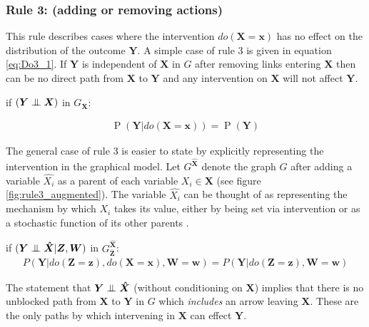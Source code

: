 \documentclass[11pt,a4paper,oneside]{book}
\newcommand{\eqn}[1]{\begin{align}#1\end{align}}
\renewcommand{\P}[1]{\operatorname{P}\left(#1\right)}
\theoremstyle{plain}
\theoremstyle{definition}
\newcommand{\ci}{\mathrel{\perp\mspace{-10mu}\perp}}
\begin{document}
\subsubsection{Rule 3: (adding or removing actions)}
This rule describes cases where the intervention $do(\boldsymbol{X}=\boldsymbol{x})$ has no effect on the distribution of the outcome $\boldsymbol{Y}$. A simple case of rule 3 is given in equation \ref{eq:Do3_1}. If $\boldsymbol{Y}$ is independent of $\boldsymbol{{X}}$ in $G$ after removing links entering $\boldsymbol{X}$ then can be no direct path from $\boldsymbol{X}$ to $\boldsymbol{Y}$ and any intervention on $\boldsymbol{X}$ will not affect $\boldsymbol{Y}$.

if $(\boldsymbol{Y} \ci \boldsymbol{{X}})$ in $G_{\boldsymbol{\overline{X}}}$:

\eqn{
\label{eq:Do3_1}
\P{\boldsymbol{Y}|do(\boldsymbol{X}=\boldsymbol{x})} = \P{\boldsymbol{Y}}
}

The general case of rule 3 is easier to state by explicitly representing the intervention in the graphical model. Let $G^{\boldsymbol{\hat{X}}}$ denote the graph $G$ after adding a variable $\hat{X_i}$ as a parent of each variable $X_i \in \boldsymbol{X}$ (see figure \ref{fig:rule3_augmented}). The variable $\hat{X_i}$ can be thought of as representing the mechanism by which $X_i$ takes its value, either by being set via intervention or as a stochastic function of its other parents \citep{Koller2009}.


if $(\boldsymbol{Y} \ci \boldsymbol{\hat{X}} |\boldsymbol{Z},\boldsymbol{W})$ in $G^{\boldsymbol{\hat{X}}}_{\boldsymbol{\overline{Z}}}$:
\eqn{
\label{eq:Do3}
P(\boldsymbol{Y}|do(\boldsymbol{Z}=\boldsymbol{z}),do(\boldsymbol{X}=\boldsymbol{x}),\boldsymbol{W}=\boldsymbol{w}) = P(\boldsymbol{Y}|do(\boldsymbol{Z}=\boldsymbol{z}),\boldsymbol{W}=\boldsymbol{w})
}

The statement that $\boldsymbol{Y} \ci \boldsymbol{\hat{X}}$ (without conditioning on $\boldsymbol{X}$) implies that there is no unblocked path from $\boldsymbol{X}$ to $\boldsymbol{Y}$ in $G$ which \emph{includes} an arrow leaving $\boldsymbol{X}$. These are the only paths by which intervening in $\boldsymbol{X}$ can effect $\boldsymbol{Y}$.
\end{document}
